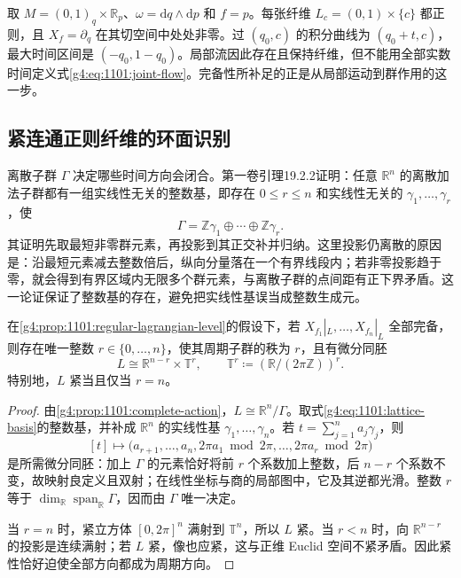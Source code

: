 \begin{example}\label{g4:exm:1101:incomplete-fibre}
	取 \(M=(0,1)_q\times\mathbb R_p\)、\(\omega=\mathrm{d}q\wedge\mathrm{d}p\) 和 \(f=p\)。每张纤维 \(L_c=(0,1)\times\{c\}\) 都正则，且 \(X_f=\partial_q\) 在其切空间中处处非零。过 \((q_0,c)\) 的积分曲线为 \((q_0+t,c)\)，最大时间区间是 \((-q_0,1-q_0)\)。局部流因此存在且保持纤维，但不能用全部实数时间定义式\eqref{g4:eq:1101:joint-flow}。完备性所补足的正是从局部运动到群作用的这一步。
\end{example}

\subsection{紧连通正则纤维的环面识别}
\label{g4:subsec:1101:04}

离散子群 \(\Gamma\) 决定哪些时间方向会闭合。第一卷引理19.2.2证明：任意 \(\mathbb R^n\) 的离散加法子群都有一组实线性无关的整数基，即存在 \(0\leq r\leq n\) 和实线性无关的 \(\gamma_1,\ldots,\gamma_r\)，使
\begin{equation}\label{g4:eq:1101:lattice-basis}
	\Gamma=\mathbb Z\gamma_1\oplus\cdots\oplus\mathbb Z\gamma_r.
\end{equation}
其证明先取最短非零群元素，再投影到其正交补并归纳。这里投影仍离散的原因是：沿最短元素减去整数倍后，纵向分量落在一个有界线段内；若非零投影趋于零，就会得到有界区域内无限多个群元素，与离散子群的点间距有正下界矛盾。这一论证保证了整数基的存在，避免把实线性基误当成整数生成元。

\begin{proposition}\label{g4:prop:1101:complete-fibre-cylinder}
	在\cref{g4:prop:1101:regular-lagrangian-level}的假设下，若 \(X_{f_1}|_L,\ldots,X_{f_n}|_L\) 全部完备，则存在唯一整数 \(r\in\{0,\ldots,n\}\)，使其周期子群的秩为 \(r\)，且有微分同胚
	\[
		L\cong\mathbb R^{n-r}\times\mathbb T^r,
		\qquad \mathbb T^r\coloneqq
		(\mathbb R/(2\pi\mathbb Z))^r.
	\]
	特别地，\(L\) 紧当且仅当 \(r=n\)。
\end{proposition}
\begin{proof}
	由\cref{g4:prop:1101:complete-action}，\(L\cong\mathbb R^n/\Gamma\)。取式\eqref{g4:eq:1101:lattice-basis}的整数基，并补成 \(\mathbb R^n\) 的实线性基 \(\gamma_1,\ldots,\gamma_n\)。若 \(t=\sum_{j=1}^n a_j\gamma_j\)，则
	\[
		[t]\longmapsto
		\bigl(a_{r+1},\ldots,a_n,
		2\pi a_1\bmod2\pi,\ldots,2\pi a_r\bmod2\pi\bigr)
	\]
	是所需微分同胚：加上 \(\Gamma\) 的元素恰好将前 \(r\) 个系数加上整数，后 \(n-r\) 个系数不变，故映射良定义且双射；在线性坐标与商的局部图中，它及其逆都光滑。整数 \(r\) 等于 \(\dim_{\mathbb R}\operatorname{span}_{\mathbb R}\Gamma\)，因而由 \(\Gamma\) 唯一决定。

	当 \(r=n\) 时，紧立方体 \([0,2\pi]^n\) 满射到 \(\mathbb T^n\)，所以 \(L\) 紧。当 \(r<n\) 时，向 \(\mathbb R^{n-r}\) 的投影是连续满射；若 \(L\) 紧，像也应紧，这与正维 Euclid 空间不紧矛盾。因此紧性恰好迫使全部方向都成为周期方向。
\end{proof}

